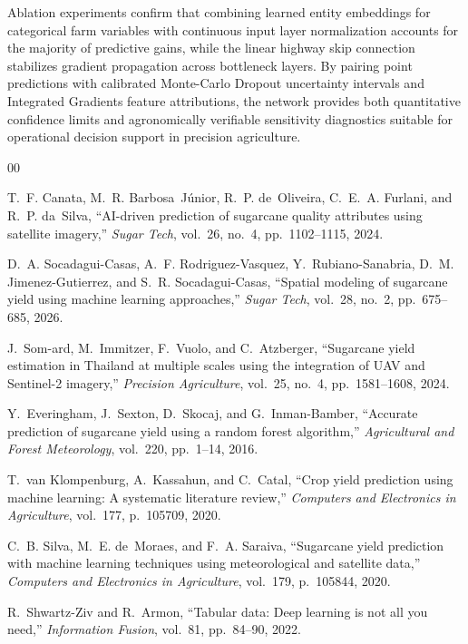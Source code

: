 \documentclass[conference,10pt,letterpaper]{IEEEtran}
\begin{document}
Ablation experiments confirm that combining learned entity embeddings for categorical farm variables with continuous input layer normalization accounts for the majority of predictive gains, while the linear highway skip connection stabilizes gradient propagation across bottleneck layers. By pairing point predictions with calibrated Monte-Carlo Dropout uncertainty intervals and Integrated Gradients feature attributions, the network provides both quantitative confidence limits and agronomically verifiable sensitivity diagnostics suitable for operational decision support in precision agriculture.

\begin{thebibliography}{00}

T.~F. Canata, M.~R. Barbosa~J{\'u}nior, R.~P. de~Oliveira, C.~E.~A. Furlani,
and R.~P. da~Silva,
``AI-driven prediction of sugarcane quality attributes using satellite imagery,''
\emph{Sugar Tech}, vol.~26, no.~4, pp.~1102--1115, 2024.

D.~A. Socadagui-Casas, A.~F. Rodriguez-Vasquez, Y.~Rubiano-Sanabria,
D.~M. Jimenez-Gutierrez, and S.~R. Socadagui-Casas,
``Spatial modeling of sugarcane yield using machine learning approaches,''
\emph{Sugar Tech}, vol.~28, no.~2, pp.~675--685, 2026.

J.~Som-ard, M.~Immitzer, F.~Vuolo, and C.~Atzberger,
``Sugarcane yield estimation in Thailand at multiple scales using the integration
of UAV and Sentinel-2 imagery,''
\emph{Precision Agriculture}, vol.~25, no.~4, pp.~1581--1608, 2024.

Y.~Everingham, J.~Sexton, D.~Skocaj, and G.~Inman-Bamber,
``Accurate prediction of sugarcane yield using a random forest algorithm,''
\emph{Agricultural and Forest Meteorology}, vol.~220, pp.~1--14, 2016.

T.~van Klompenburg, A.~Kassahun, and C.~Catal,
``Crop yield prediction using machine learning: A systematic literature review,''
\emph{Computers and Electronics in Agriculture}, vol.~177, p.~105709, 2020.

C.~B. Silva, M.~E. de~Moraes, and F.~A. Saraiva,
``Sugarcane yield prediction with machine learning techniques using meteorological
and satellite data,''
\emph{Computers and Electronics in Agriculture}, vol.~179, p.~105844, 2020.

R.~Shwartz-Ziv and R.~Armon,
``Tabular data: Deep learning is not all you need,''
\emph{Information Fusion}, vol.~81, pp.~84--90, 2022.


\end{thebibliography}
\end{document}
